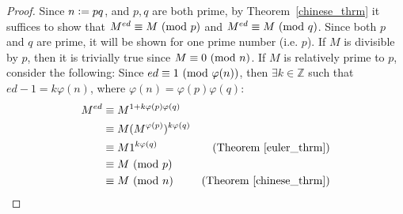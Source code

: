 \begin{proof}
Since $n \vcentcolon= pq$, and $p,q$ are both prime, by Theorem~\ref{chinese_thrm} it suffices to show that $M^{ed} \equiv M ~(\mathrm{mod}~p)$ and $M^{ed} \equiv M ~(\mathrm{mod}~q)$. Since both $p$ and $q$ are prime, it will be shown for one prime number (i.e. $p$). If $M$ is divisible by $p$, then it is trivially true since $M \equiv 0 ~(\mathrm{mod}~n)$. If $M$  is relatively prime to $p$, consider the following: Since $ed \equiv 1 ~(\mathrm{mod}~\varphi(n))$, then $\exists k \in \mathbb{Z}$ such that $ed - 1 = k \varphi(n)$, where $\varphi(n) = \varphi(p) \varphi(q)$:
\begin{align*}
M^{ed} &\equiv M^{1 + k \varphi(p) \varphi(q)} \\
&\equiv M (M^{\varphi(p)})^{k \varphi(q)} \\
&\equiv M 1^{k \varphi(q)} & (\text{Theorem}~\ref{euler_thrm}) \\
&\equiv M ~(\mathrm{mod}~p) \\
&\equiv M ~(\mathrm{mod}~n) & (\text{Theorem}~\ref{chinese_thrm})
\end{align*}

\end{proof}

